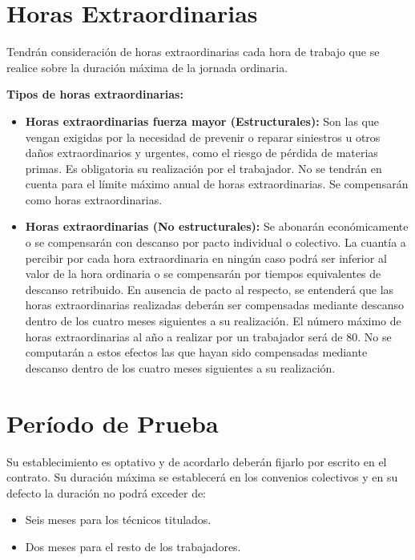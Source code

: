 \documentclass{article}
\begin{document}
	\section*{Horas Extraordinarias}
	
	Tendrán consideración de horas extraordinarias cada hora de trabajo que se realice sobre la duración máxima de la jornada ordinaria.
	
	\textbf{Tipos de horas extraordinarias:}
	
	\begin{itemize}
		\item \checkmark \textbf{Horas extraordinarias fuerza mayor (Estructurales):} Son las que vengan exigidas por la necesidad de prevenir o reparar siniestros u otros daños extraordinarios y urgentes, como el riesgo de pérdida de materias primas. Es obligatoria su realización por el trabajador. No se tendrán en cuenta para el límite máximo anual de horas extraordinarias. Se compensarán como horas extraordinarias.
		\item \checkmark \textbf{Horas extraordinarias (No estructurales):} Se abonarán económicamente o se compensarán con descanso por pacto individual o colectivo. La cuantía a percibir por cada hora extraordinaria en ningún caso podrá ser inferior al valor de la hora ordinaria o se compensarán por tiempos equivalentes de descanso retribuido. En ausencia de pacto al respecto, se entenderá que las horas extraordinarias realizadas deberán ser compensadas mediante descanso dentro de los cuatro meses siguientes a su realización. El número máximo de horas extraordinarias al año a realizar por un trabajador será de 80. No se computarán a estos efectos las que hayan sido compensadas mediante descanso dentro de los cuatro meses siguientes a su realización.
	\end{itemize}
	
	\section*{Período de Prueba}
	
	Su establecimiento es optativo y de acordarlo deberán fijarlo por escrito en el contrato. Su duración máxima se establecerá en los convenios colectivos y en su defecto la duración no podrá exceder de:
	
	\begin{itemize}
		\item Seis meses para los técnicos titulados.
		\item Dos meses para el resto de los trabajadores.
	\end{itemize}
	
\end{document}
